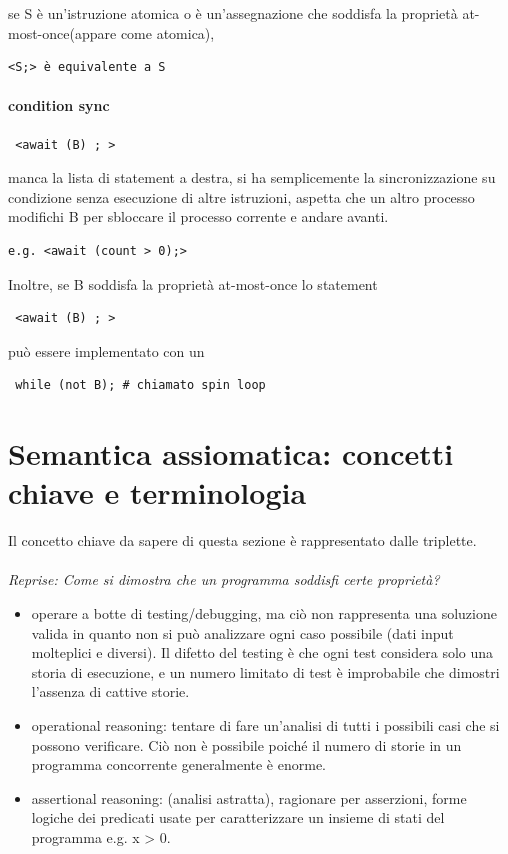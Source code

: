 \documentclass[10pt,a4paper]{book}
\begin{document}
se S è un'istruzione atomica o è un'assegnazione che soddisfa la proprietà at-most-once(appare come atomica), \begin{verbatim}<S;> è equivalente a S\end{verbatim} 

\paragraph{condition sync}
\begin{verbatim} <await (B) ; >\end{verbatim}
manca la lista di statement a destra, si ha semplicemente la sincronizzazione su condizione senza esecuzione di altre istruzioni, aspetta che un altro processo modifichi B per sbloccare il processo corrente e andare avanti.
 \begin{verbatim}e.g. <await (count > 0);>\end{verbatim}

Inoltre, se B soddisfa la proprietà at-most-once lo statement \begin{verbatim} <await (B) ; >\end{verbatim} può essere implementato con un \begin{verbatim} while (not B); # chiamato spin loop\end{verbatim}


\section{Semantica assiomatica: concetti chiave e terminologia}
Il concetto chiave da sapere di questa sezione è rappresentato dalle triplette.\\ \\
\textit{Reprise: Come si dimostra che un programma soddisfi certe proprietà?}
\begin{itemize}
\item operare a botte di testing/debugging, ma ciò non rappresenta una soluzione valida in quanto non si può analizzare ogni caso possibile (dati input molteplici e diversi). Il difetto del testing è che ogni test considera solo una storia di esecuzione, e un numero limitato di test è improbabile che dimostri l'assenza di cattive storie.
\item operational reasoning: tentare di fare un'analisi di tutti i possibili casi che si possono verificare. Ciò non è possibile poiché il numero di storie in un programma concorrente generalmente è enorme.
\item assertional reasoning: (analisi astratta), ragionare per asserzioni, forme logiche dei predicati usate per caratterizzare un insieme di stati del programma e.g. x > 0.
\end{itemize}
\end{document}
